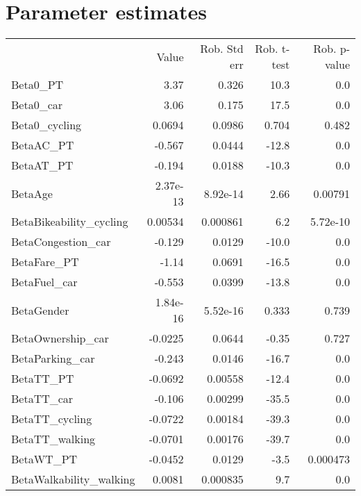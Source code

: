 \section{Parameter estimates}
\begin{tabular}{lrrrr}
 & Value & Rob. Std err & Rob. t-test & Rob. p-value \\
Beta0_PT & 3.37 & 0.326 & 10.3 & 0.0 \\
Beta0_car & 3.06 & 0.175 & 17.5 & 0.0 \\
Beta0_cycling & 0.0694 & 0.0986 & 0.704 & 0.482 \\
BetaAC_PT & -0.567 & 0.0444 & -12.8 & 0.0 \\
BetaAT_PT & -0.194 & 0.0188 & -10.3 & 0.0 \\
BetaAge & 2.37e-13 & 8.92e-14 & 2.66 & 0.00791 \\
BetaBikeability_cycling & 0.00534 & 0.000861 & 6.2 & 5.72e-10 \\
BetaCongestion_car & -0.129 & 0.0129 & -10.0 & 0.0 \\
BetaFare_PT & -1.14 & 0.0691 & -16.5 & 0.0 \\
BetaFuel_car & -0.553 & 0.0399 & -13.8 & 0.0 \\
BetaGender & 1.84e-16 & 5.52e-16 & 0.333 & 0.739 \\
BetaOwnership_car & -0.0225 & 0.0644 & -0.35 & 0.727 \\
BetaParking_car & -0.243 & 0.0146 & -16.7 & 0.0 \\
BetaTT_PT & -0.0692 & 0.00558 & -12.4 & 0.0 \\
BetaTT_car & -0.106 & 0.00299 & -35.5 & 0.0 \\
BetaTT_cycling & -0.0722 & 0.00184 & -39.3 & 0.0 \\
BetaTT_walking & -0.0701 & 0.00176 & -39.7 & 0.0 \\
BetaWT_PT & -0.0452 & 0.0129 & -3.5 & 0.000473 \\
BetaWalkability_walking & 0.0081 & 0.000835 & 9.7 & 0.0 \\
\end{tabular}

